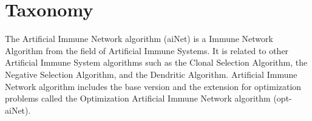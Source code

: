 \documentclass[a4paper, 11pt]{article}
\begin{document}
\section{Taxonomy}
\label{sec:taxonomy}
The Artificial Immune Network algorithm (aiNet) is a Immune Network Algorithm from the field of Artificial Immune Systems.
It is related to other Artificial Immune System algorithms such as the Clonal Selection Algorithm, the Negative Selection Algorithm, and the Dendritic Algorithm.
Artificial Immune Network algorithm includes the base version and the extension for optimization problems called the Optimization Artificial Immune Network algorithm (opt-aiNet).

\end{document}
